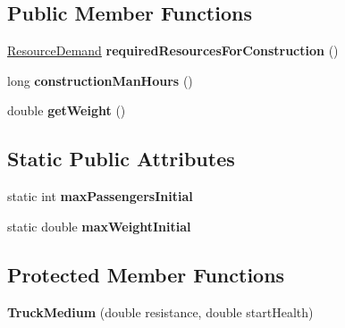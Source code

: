 \subsection*{Public Member Functions}
\begin{DoxyCompactItemize}
\item 
\hyperlink{classuniverse_1_1_resource_demand}{Resource\+Demand} {\bfseries required\+Resources\+For\+Construction} ()\hypertarget{classtools_1_1vehicles_1_1roadgoing_1_1_truck_medium_a4739effb80b0a8653697a5a74b80f9ef}{}\label{classtools_1_1vehicles_1_1roadgoing_1_1_truck_medium_a4739effb80b0a8653697a5a74b80f9ef}

\item 
long {\bfseries construction\+Man\+Hours} ()\hypertarget{classtools_1_1vehicles_1_1roadgoing_1_1_truck_medium_ac0272ec973181cfcfc186fc289ddd8cd}{}\label{classtools_1_1vehicles_1_1roadgoing_1_1_truck_medium_ac0272ec973181cfcfc186fc289ddd8cd}

\item 
double {\bfseries get\+Weight} ()\hypertarget{classtools_1_1vehicles_1_1roadgoing_1_1_truck_medium_ac59681aa0345cab4fbd4182078d3619e}{}\label{classtools_1_1vehicles_1_1roadgoing_1_1_truck_medium_ac59681aa0345cab4fbd4182078d3619e}

\end{DoxyCompactItemize}
\subsection*{Static Public Attributes}
\begin{DoxyCompactItemize}
\item 
static int {\bfseries max\+Passengers\+Initial}\hypertarget{classtools_1_1vehicles_1_1roadgoing_1_1_truck_medium_ad1b7bc546af04e29a1f2f7f955211096}{}\label{classtools_1_1vehicles_1_1roadgoing_1_1_truck_medium_ad1b7bc546af04e29a1f2f7f955211096}

\item 
static double {\bfseries max\+Weight\+Initial}\hypertarget{classtools_1_1vehicles_1_1roadgoing_1_1_truck_medium_a1be678c8f5de879a105498051b996b68}{}\label{classtools_1_1vehicles_1_1roadgoing_1_1_truck_medium_a1be678c8f5de879a105498051b996b68}

\end{DoxyCompactItemize}
\subsection*{Protected Member Functions}
\begin{DoxyCompactItemize}
\item 
{\bfseries Truck\+Medium} (double resistance, double start\+Health)\hypertarget{classtools_1_1vehicles_1_1roadgoing_1_1_truck_medium_a2c0f2a4cc4ce3982e6e980572dd18ffd}{}\label{classtools_1_1vehicles_1_1roadgoing_1_1_truck_medium_a2c0f2a4cc4ce3982e6e980572dd18ffd}

\end{DoxyCompactItemize}
